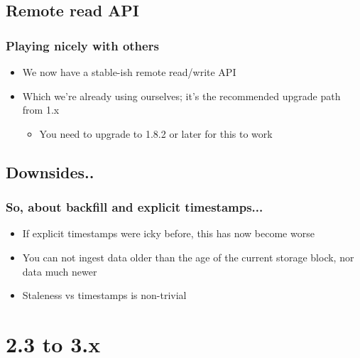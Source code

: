 \documentclass[t]{beamer}
\begin{document}


\subsection{Remote read API}

\begin{frame}
	\frametitle{Playing nicely with others}
	\begin{itemize}
		\item We now have a stable-ish remote read/write API
		\item Which we're already using ourselves; it's the recommended upgrade path from 1.x
		\begin{itemize}
			\item You need to upgrade to 1.8.2 or later for this to work
		\end{itemize}
	\end{itemize}
\end{frame}


\subsection{Downsides..}

\begin{frame}
	\frametitle{So, about backfill and explicit timestamps...}
	\begin{itemize}
		\item If explicit timestamps were icky before, this has now become worse
		\item You can not ingest data older than the age of the current storage block, nor data much newer
		\item Staleness vs timestamps is non-trivial
	\end{itemize}
\end{frame}



\section{2.3 to 3.x}
\end{document}
